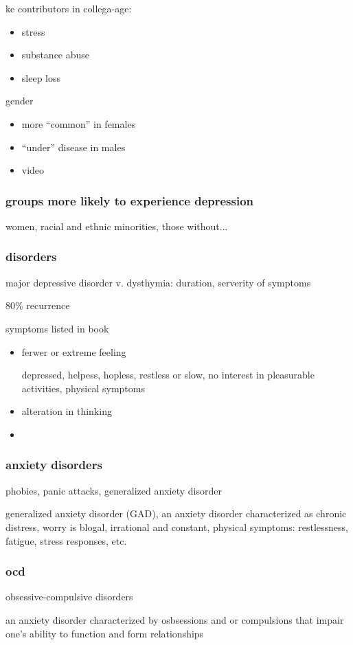 \documentclass[letterpaper]{article}
\begin{document}
ke contributors in collega-age:
\begin{itemize}
\item
stress
\item
substance abuse
\item
sleep loss
\end{itemize}

gender
\begin{itemize}
\item
more ``common'' in females
\item
``under'' disease in males
\item
video
\end{itemize}
\subsubsection*{groups more likely to experience depression}
women, racial and ethnic minorities, those without...


\subsubsection*{disorders}
major depressive disorder v. dysthymia: duration, serverity of symptoms

80\% recurrence

symptoms listed in book
\begin{itemize}
\item
ferwer or extreme feeling

depressed, helpess, hopless, restless or slow, no interest in pleasurable activities, physical symptoms
\item
alteration in thinking
\item
\end{itemize}
\subsubsection*{anxiety disorders}
phobies, panic attacks, generalized anxiety disorder

generalized anxiety disorder (GAD), an anxiety disorder characterized as chronic distress, worry is blogal, irrational and constant, physical symptoms: restlessness, fatigue, stress responses, etc.

\subsubsection*{ocd}
obsessive-compulsive disorders

an anxiety disorder characterized by osbsessions and or compulsions that impair one's ability to function and form relationships
\end{document}

